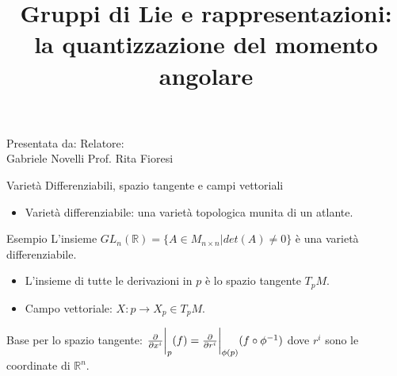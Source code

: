 \documentclass{beamer}
\theoremstyle{definition}
\theoremstyle{Theorem}
\theoremstyle{definition}
\theoremstyle{definition}
\theoremstyle{definition}
\begin{document}
\begin{frame}
	\title{Gruppi di Lie e rappresentazioni: la quantizzazione del momento angolare}
    \date{  }
    \maketitle
    	 Presentata da: \hspace{4.5cm} Relatore: \\
    	 Gabriele Novelli \hspace{4.5cm} Prof. Rita Fioresi
\end{frame}
\begin{frame}{Varietà Differenziabili, spazio tangente e campi vettoriali}
	\begin{itemize}
		\item Varietà differenziabile: una varietà topologica munita di un atlante.
	\end{itemize}
	\begin{exampleblock}{Esempio}
		L'insieme $GL_n(\mathbb{R})=\{A\in M_{n\times n}|det(A)\neq0\}$ è una varietà differenziabile.
	\end{exampleblock}
	\begin{itemize}
	\item L'insieme di tutte le derivazioni in $p$ è lo spazio tangente $T_pM$.
	\item Campo vettoriale: $X: p\rightarrow X_p\in T_pM$.
\end{itemize}
	Base per lo spazio tangente: ${\partial\over \partial x^i}\bigg\rvert_p(f)={\partial\over \partial r^i}\bigg\rvert_{\phi(p)}(f\circ \phi^{-1})$ dove $r^i$ sono le coordinate di $\mathbb{R}^n$.	
\end{frame}
\end{document}
